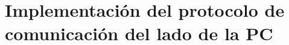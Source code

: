 
% 
% 
% 

\section[Implementaci\'on del protocolo en PC]{Implementaci\'on del protocolo de comunicaci\'on del lado de la PC}
